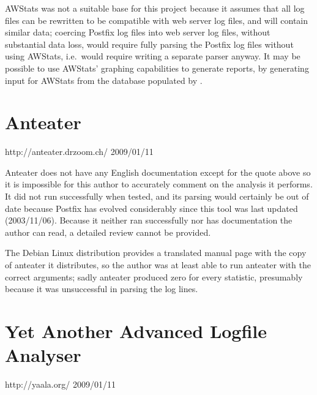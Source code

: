 AWStats was not a suitable base for this project because it assumes that
all log files can be rewritten to be compatible with web server log files,
and will contain similar data; coercing Postfix log files into web server
log files, without substantial data loss, would require fully parsing the
Postfix log files without using AWStats, i.e.\ would require writing a
separate parser anyway.  It may be possible to use AWStats' graphing
capabilities to generate reports, by generating input for AWStats from the
database populated by \parsername{}.

\section{Anteater}

{http://anteater.drzoom.ch/}
{2009/01/11}

Anteater does not have any English documentation except for the quote above
so it is impossible for this author to accurately comment on the analysis
it performs.  It did not run successfully when tested, and its parsing
would certainly be out of date because Postfix has evolved considerably
since this tool was last updated (2003/11/06).  Because it neither ran
successfully nor has documentation the author can read, a detailed review
cannot be provided.

The Debian Linux distribution provides a translated manual page with the
copy of anteater it distributes, so the author was at least able to run
anteater with the correct arguments; sadly anteater produced zero for every
statistic, presumably because it was unsuccessful in parsing the log lines.

\section{Yet Another Advanced Logfile Analyser}

{http://yaala.org/}
{2009/01/11}

